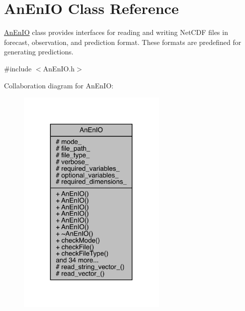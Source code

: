 \hypertarget{class_an_en_i_o}{}\section{An\+En\+IO Class Reference}
\label{class_an_en_i_o}


\mbox{\hyperlink{class_an_en_i_o}{An\+En\+IO}} class provides interfaces for reading and writing Net\+C\+DF files in forecast, observation, and prediction format. These formats are predefined for generating predictions.  




{\ttfamily \#include $<$An\+En\+I\+O.\+h$>$}



Collaboration diagram for An\+En\+IO\+:
\nopagebreak
\begin{figure}[H]
\begin{center}
\leavevmode
\includegraphics[width=203pt]{class_an_en_i_o__coll__graph}
\end{center}
\end{figure}
